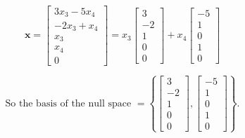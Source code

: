 \documentclass[a4paper,11pt,reqno]{amsart}
\numberwithin{equation}{section}
\begin{document}
\begin{center}
{{\[
\mathbf{x} =\begin{bmatrix} 3x_3 - 5x_4 \\ -2x_3 + x_4 \\ x_3 \\ x_4 \\ 0 \end{bmatrix}
=
x_3 \begin{bmatrix} 3 \\ -2 \\ 1 \\ 0 \\ 0 \end{bmatrix}
+ x_4 \begin{bmatrix} -5 \\ 1 \\ 0 \\ 1 \\ 0 \end{bmatrix}
\]

\[
\text{So the  basis of the null space }=
\left\{
\begin{bmatrix} 3 \\ -2 \\ 1 \\ 0 \\ 0 \end{bmatrix}, 
\begin{bmatrix} -5 \\ 1 \\ 0 \\ 1 \\ 0 \end{bmatrix}
\right\}.
\]
}}
\end{center}





\end{document}
